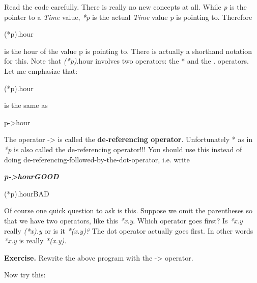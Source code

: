 \documentclass[
]{article}
\begin{document}
Read the code carefully. There is really no new concepts at all. While
\emph{p} is the pointer to a \emph{Time} value, \emph{*p} is the actual
\emph{Time} value \emph{p} is pointing to. Therefore

(*p).hour

is the hour of the value p is pointing to. There is actually a shorthand
notation for this. Note that \emph{(*p)}.hour involves two operators:
the * and the . operators. Let me emphasize that:

(*p).hour

is the same as

p-\textgreater hour

The operator -\textgreater{} is called the \textbf{de-referencing
operator}. Unfortunately * as in \emph{*p} is also called the
de-referencing operator!!! You should use this instead of doing
de-referencing-followed-by-the-dot-operator, i.e. write

\emph{\textbf{p-\textgreater hourGOOD}}

(*p).hourBAD

Of course one quick question to ask is this. Suppose we omit the
parentheses so that we have two operators, like this \emph{*x.y}. Which
operator goes first? Is \emph{*x.y} really \emph{(*x).y} or is it
\emph{*(x.y)?} The dot operator actually goes first. In other words
\emph{*x.y} is really \emph{*(x.y).}

\textbf{Exercise.} Rewrite the above program with the -\textgreater{}
operator.

Now try this:
\end{document}
